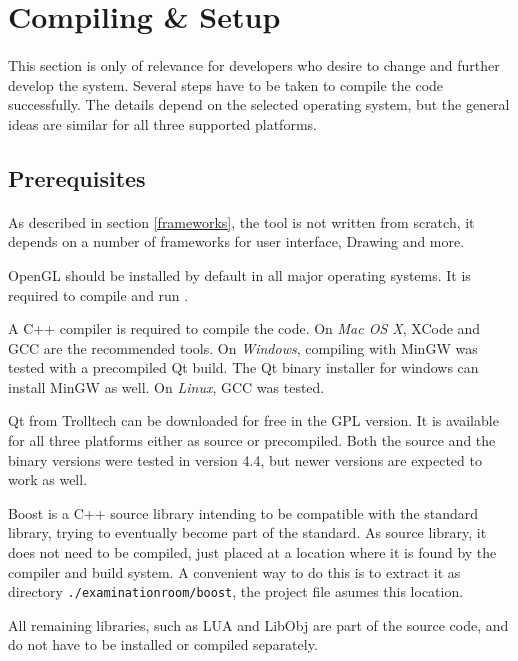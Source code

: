 \section{Compiling \& Setup}
\paragraph{}
This section is only of relevance for developers who desire to change and further develop the system. Several steps have to be taken to compile the code successfully.
The details depend on the selected operating system, but the general ideas are similar for all three supported platforms.

\subsection{Prerequisites}
\paragraph{}
As described in section \ref{frameworks}, the tool is not written from scratch, it depends on a number of frameworks for user interface, Drawing and more.

OpenGL should be installed by default in all major operating systems. It is required to compile and run \ER.

A C++ compiler is required to compile the code.
On \textit{Mac OS X}, XCode and GCC are the recommended tools.
On \textit{Windows}, compiling with MinGW was tested with a precompiled Qt build.
The Qt binary installer for windows can install MinGW as well.
On \textit{Linux}, GCC was tested.

Qt from Trolltech can be downloaded for free in the GPL version\cite{qt}.
It is available for all three platforms either as source or precompiled.
Both the source and the binary versions were tested in version 4.4, but newer versions are expected to work as well.

Boost is a C++ source library intending to be compatible with the standard library, trying to eventually become part of the standard\cite{boost}.
As source library, it does not need to be compiled, just placed at a location where it is found by the compiler and build system.
A convenient way to do this is to extract it as directory \texttt{./examinationroom/boost}, the project file asumes this location.

All remaining libraries, such as LUA and LibObj are part of the source code, and do not have to be installed or compiled separately.


